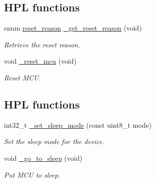 \subsection*{H\+PL functions}
\begin{DoxyCompactItemize}
\item 
enum \hyperlink{group___h_p_l_ga9066b7b3f20c4514ad24dcbff8fa3898}{reset\+\_\+reason} \hyperlink{group___h_p_l_gab7e1d30a2aa0a64c175ce3ce373b3c4f}{\+\_\+get\+\_\+reset\+\_\+reason} (void)
\begin{DoxyCompactList}\small\item\em Retrieve the reset reason. \end{DoxyCompactList}\item 
\mbox{\label{group___h_p_l_gaf1c17c7797e22fd860d303deda80e17c}} 
void \hyperlink{group___h_p_l_gaf1c17c7797e22fd860d303deda80e17c}{\+\_\+reset\+\_\+mcu} (void)
\begin{DoxyCompactList}\small\item\em Reset M\+CU. \end{DoxyCompactList}\end{DoxyCompactItemize}
\subsection*{H\+PL functions}
\begin{DoxyCompactItemize}
\item 
int32\+\_\+t \hyperlink{group___h_p_l_ga3e27d1d2dd8b2515a6724be9b34388f1}{\+\_\+set\+\_\+sleep\+\_\+mode} (const uint8\+\_\+t mode)
\begin{DoxyCompactList}\small\item\em Set the sleep mode for the device. \end{DoxyCompactList}\item 
\mbox{\label{group___h_p_l_ga8977ae60a1c30b8c2216f8f2a9c59b5e}} 
void \hyperlink{group___h_p_l_ga8977ae60a1c30b8c2216f8f2a9c59b5e}{\+\_\+go\+\_\+to\+\_\+sleep} (void)
\begin{DoxyCompactList}\small\item\em Put M\+CU to sleep. \end{DoxyCompactList}\end{DoxyCompactItemize}
